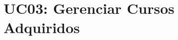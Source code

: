            
            
            
            


        \section*{UC03: Gerenciar Cursos Adquiridos}

